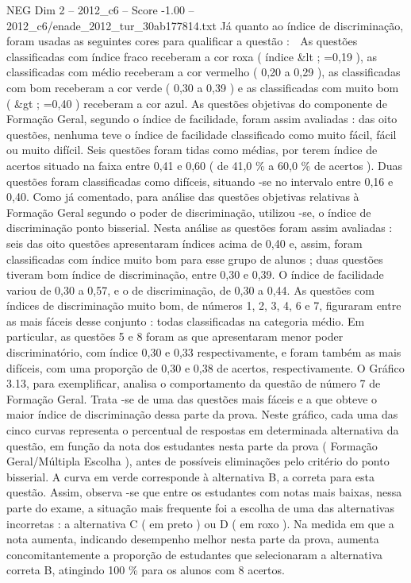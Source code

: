 \begin{textsample}{NEG Dim 2 – 2012\_c6 – Score -1.00 – 2012\_c6/enade\_2012\_tur\_30ab177814.txt}
Já quanto ao índice de discriminação, foram usadas as seguintes cores para qualificar a questão :  As questões classificadas com índice fraco receberam a cor roxa ( índice \&lt ; =0,19 ), as classificadas com médio receberam a cor vermelho ( 0,20 a 0,29 ), as classificadas com bom receberam a cor verde ( 0,30 a 0,39 ) e as classificadas com muito bom ( \&gt ; =0,40 ) receberam a cor azul.
As questões objetivas do componente de Formação Geral, segundo o índice de facilidade, foram assim avaliadas : das oito questões, nenhuma teve o índice de facilidade classificado como muito fácil, fácil ou muito difícil.
Seis questões foram tidas como médias, por terem índice de acertos situado na faixa entre 0,41 e 0,60 ( de 41,0 \% a 60,0 \% de acertos ).
Duas questões foram classificadas como difíceis, situando -se no intervalo entre 0,16 e 0,40.
Como já comentado, para análise das questões objetivas relativas à Formação Geral segundo o poder de discriminação, utilizou -se, o índice de discriminação ponto bisserial.
Nesta análise as questões foram assim avaliadas : seis das oito questões apresentaram índices acima de 0,40 e, assim, foram classificadas com índice muito bom para esse grupo de alunos ; duas questões tiveram bom índice de discriminação, entre 0,30 e 0,39.
O índice de facilidade variou de 0,30 a 0,57, e o de discriminação, de 0,30 a 0,44.
As questões com índices de discriminação muito bom, de números 1, 2, 3, 4, 6 e 7, figuraram entre as mais fáceis desse conjunto : todas classificadas na categoria médio.
Em particular, as questões 5 e 8 foram as que apresentaram menor poder discriminatório, com índice 0,30 e 0,33 respectivamente, e foram também as mais difíceis, com uma proporção de 0,30 e 0,38 de acertos, respectivamente.
O Gráfico 3.13, para exemplificar, analisa o comportamento da questão de número 7 de Formação Geral.
Trata -se de uma das questões mais fáceis e a que obteve o maior índice de discriminação dessa parte da prova.
Neste gráfico, cada uma das cinco curvas representa o percentual de respostas em determinada alternativa da questão, em função da nota dos estudantes nesta parte da prova ( Formação Geral/Múltipla Escolha ), antes de possíveis eliminações pelo critério do ponto bisserial.
A curva em verde corresponde à alternativa B, a correta para esta questão.
Assim, observa -se que entre os estudantes com notas mais baixas, nessa parte do exame, a situação mais frequente foi a escolha de uma das alternativas incorretas : a alternativa C ( em preto ) ou D ( em roxo ).
Na medida em que a nota aumenta, indicando desempenho melhor nesta parte da prova, aumenta concomitantemente a proporção de estudantes que selecionaram a alternativa correta B, atingindo 100 \% para os alunos com 8 acertos.

\end{textsample}
